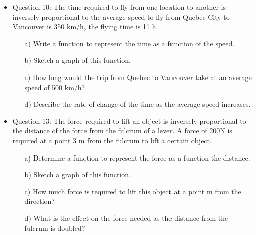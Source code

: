 \documentclass{article}
\begin{document}
\begin{itemize}
\item Question 10: The time required to fly from one location to another is inversely proportional to the average speed to fly from Quebec City to Vancouver is 350 km/h, the flying time is 11 h.
\begin{enumerate}
    \item[a)] Write a function to represent the time as a function of the speed.
    \item[b)] Sketch a graph of this function.
    \item[c)] How long would the trip from Quebec to Vancouver take at an average speed of 500 km/h?
    \item[d)] Describe the rate of change of the time as the average speed increases. 
\end{enumerate}
\item Question 13: The force required to lift an object is inversely proportional to the distance of the force from the fulcrum of a lever. A force of 200N is required at a point 3 m from the fulcrum to lift a certain object.
\begin{enumerate}
    \item[a)] Determine a function to represent the force as a function the distance.
    \item[b)] Sketch a graph of this function.
    \item[c)] How much force is required to lift this object at a point m from the direction?
    \item[d)] What is the effect on the force needed as the distance from the fulcrum is doubled? 
\end{enumerate}
\end{itemize}
\newpage
\end{document}
